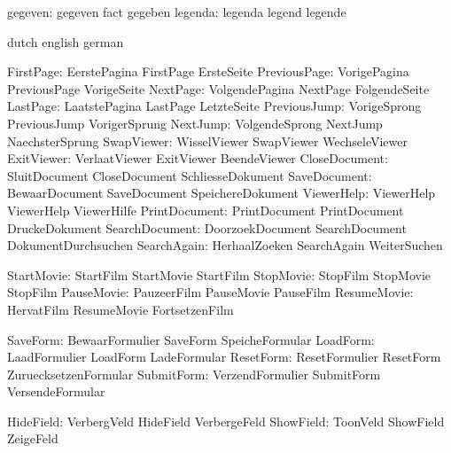             gegeven:  gegeven              fact                gegeben
            legenda:  legenda              legend              legende

\stopelements




\startvariables      dutch             english              german

         FirstPage:  EerstePagina      FirstPage            ErsteSeite
      PreviousPage:  VorigePagina      PreviousPage         VorigeSeite
          NextPage:  VolgendePagina    NextPage             FolgendeSeite
          LastPage:  LaatstePagina     LastPage             LetzteSeite
      PreviousJump:  VorigeSprong      PreviousJump         VorigerSprung
          NextJump:  VolgendeSprong    NextJump             NaechsterSprung
        SwapViewer:  WisselViewer      SwapViewer           WechseleViewer
        ExitViewer:  VerlaatViewer     ExitViewer           BeendeViewer
     CloseDocument:  SluitDocument     CloseDocument        SchliesseDokument
      SaveDocument:  BewaarDocument    SaveDocument         SpeichereDokument
        ViewerHelp:  ViewerHelp        ViewerHelp           ViewerHilfe
     PrintDocument:  PrintDocument     PrintDocument        DruckeDokument
    SearchDocument:  DoorzoekDocument  SearchDocument       DokumentDurchsuchen
       SearchAgain:  HerhaalZoeken     SearchAgain          WeiterSuchen

        StartMovie:  StartFilm         StartMovie           StartFilm
         StopMovie:  StopFilm          StopMovie            StopFilm
        PauseMovie:  PauzeerFilm       PauseMovie           PauseFilm
       ResumeMovie:  HervatFilm        ResumeMovie          FortsetzenFilm

          SaveForm:  BewaarFormulier   SaveForm             SpeicheFormular
          LoadForm:  LaadFormulier     LoadForm             LadeFormular
         ResetForm:  ResetFormulier    ResetForm            ZuruecksetzenFormular
        SubmitForm:  VerzendFormulier  SubmitForm           VersendeFormular

         HideField:  VerbergVeld       HideField            VerbergeFeld
         ShowField:  ToonVeld          ShowField            ZeigeFeld

